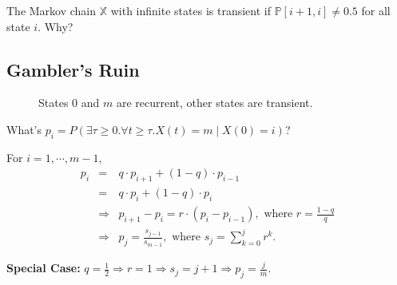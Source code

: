 \begin{exercise}
The Markov chain $ \mathbb{X} $ with infinite states is transient if $ \mathbb{P}[i + 1, i] \neq 0.5 $ for all state $ i $. Why?
\end{exercise}

\subsection{Gambler's Ruin} \label{subsec:gambler-ruin}

\begin{figure}[htp]
\centering
{}

States $ 0 $ and $ m $ are recurrent, other states are transient.
\end{figure}

\begin{question}
What's $ p_{i} = P(\exists \tau \ge 0. \forall t \ge \tau. X(t) = m \mid X(0) = i) $?

For $ i = 1, \cdots, m - 1 $,
\begin{eqnarray*}
p_{i}
  & = & q \cdot p_{i + 1} + (1 - q) \cdot p_{i - 1} \\
  & = & q \cdot p_{i} + (1 - q) \cdot p_{i} \\
  & \Rightarrow & p_{i + 1} - p_{i} = r \cdot (p_{i} - p_{i - 1}), \text{ where } r = \frac{1 - q}{q} \\
  & \Rightarrow & p_{j} = \frac{s_{j - 1}}{s_{m - 1}}, \text{ where } s_{j} = \sum_{k = 0}^{j} r^{k}.
\end{eqnarray*}

{\bf Special Case:} $ q = \frac{1}{2} \Rightarrow r = 1 \Rightarrow s_{j} = j + 1 \Rightarrow p_{j} = \frac{j}{m} $.
\end{question}


